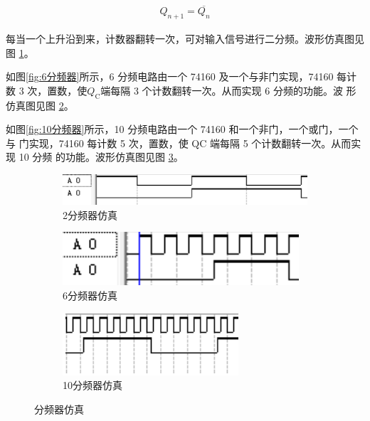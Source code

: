 \documentclass[twoside, openright]{article}
\begin{document}
\begin{align}
	Q_{n+1} = \overline{Q_n}
\end{align}

每当一个上升沿到来，计数器翻转一次，可对输入信号进行二分频。波形仿真图见图
\ref{fig:2分频器仿真}。

如图\ref{fig:6分频器}所示，6 分频电路由一个 74160 及一个与非门实现，74160 每计数
3 次，置数，使$ Q_\mathrm{C} $端每隔 3 个计数翻转一次。从而实现 6 分频的功能。波
形仿真图见图 \ref{fig:6分频器仿真}。

如图\ref{fig:10分频器}所示，10 分频电路由一个 74160 和一个非门，一个或门，一个与
门实现，74160 每计数 5 次，置数，使 QC 端每隔 5 个计数翻转一次。从而实现 10 分频
的功能。波形仿真图见图 \ref{fig:10分频器仿真}。

\begin{figure}[htbp]
	\centering
	\begin{subfigure}[htbp]{.45\linewidth}
		\centering
		\includegraphics[width = \linewidth]{2-2.png}
		\caption{2分频器仿真}
		\label{fig:2分频器仿真}
	\end{subfigure}
	\quad
	\begin{subfigure}[htbp]{.45\linewidth}
		\centering
		\includegraphics[width = \linewidth]{6-2.png}
		\caption{6分频器仿真}
		\label{fig:6分频器仿真}
	\end{subfigure}
	\quad
	\begin{subfigure}[htbp]{.45\linewidth}
		\centering
		\includegraphics[width = \linewidth]{10-2.png}
		\caption{10分频器仿真}
		\label{fig:10分频器仿真}
	\end{subfigure}
	\caption{分频器仿真}
	\label{fig:分频器仿真}
\end{figure}
\end{document}
